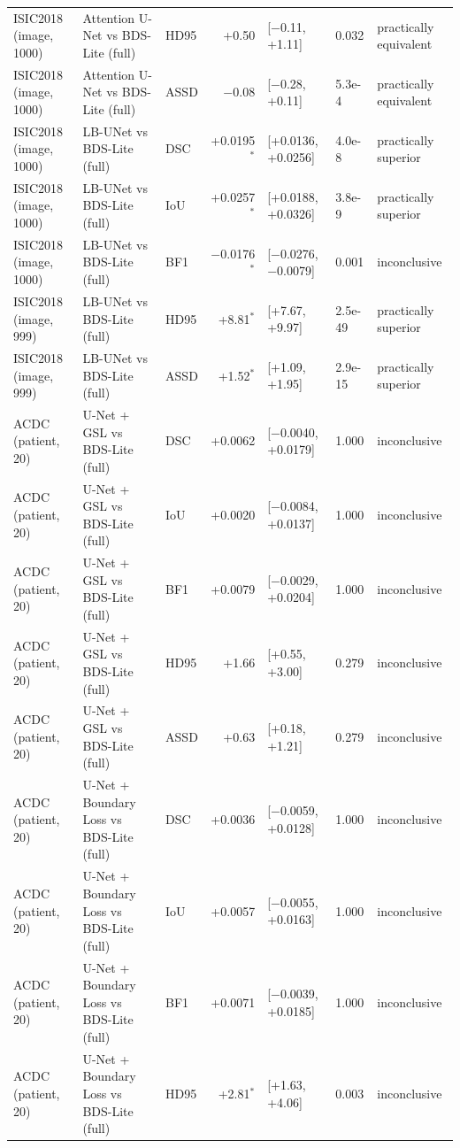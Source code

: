 \begin{tabular}{lllrlll}
ISIC2018 (image, 1000) & Attention U-Net vs BDS-Lite (full) & HD95 & +0.50 & [$-$0.11, +1.11] & 0.032 & practically equivalent \\
ISIC2018 (image, 1000) & Attention U-Net vs BDS-Lite (full) & ASSD & $-$0.08 & [$-$0.28, +0.11] & 5.3e-4 & practically equivalent \\
ISIC2018 (image, 1000) & LB-UNet vs BDS-Lite (full) & DSC & +0.0195$^{*}$ & [+0.0136, +0.0256] & 4.0e-8 & practically superior \\
ISIC2018 (image, 1000) & LB-UNet vs BDS-Lite (full) & IoU & +0.0257$^{*}$ & [+0.0188, +0.0326] & 3.8e-9 & practically superior \\
ISIC2018 (image, 1000) & LB-UNet vs BDS-Lite (full) & BF1 & $-$0.0176$^{*}$ & [$-$0.0276, $-$0.0079] & 0.001 & inconclusive \\
ISIC2018 (image, 999) & LB-UNet vs BDS-Lite (full) & HD95 & +8.81$^{*}$ & [+7.67, +9.97] & 2.5e-49 & practically superior \\
ISIC2018 (image, 999) & LB-UNet vs BDS-Lite (full) & ASSD & +1.52$^{*}$ & [+1.09, +1.95] & 2.9e-15 & practically superior \\
\midrule
ACDC (patient, 20) & U-Net + GSL vs BDS-Lite (full) & DSC & +0.0062 & [$-$0.0040, +0.0179] & 1.000 & inconclusive \\
ACDC (patient, 20) & U-Net + GSL vs BDS-Lite (full) & IoU & +0.0020 & [$-$0.0084, +0.0137] & 1.000 & inconclusive \\
ACDC (patient, 20) & U-Net + GSL vs BDS-Lite (full) & BF1 & +0.0079 & [$-$0.0029, +0.0204] & 1.000 & inconclusive \\
ACDC (patient, 20) & U-Net + GSL vs BDS-Lite (full) & HD95 & +1.66 & [+0.55, +3.00] & 0.279 & inconclusive \\
ACDC (patient, 20) & U-Net + GSL vs BDS-Lite (full) & ASSD & +0.63 & [+0.18, +1.21] & 0.279 & inconclusive \\
ACDC (patient, 20) & U-Net + Boundary Loss vs BDS-Lite (full) & DSC & +0.0036 & [$-$0.0059, +0.0128] & 1.000 & inconclusive \\
ACDC (patient, 20) & U-Net + Boundary Loss vs BDS-Lite (full) & IoU & +0.0057 & [$-$0.0055, +0.0163] & 1.000 & inconclusive \\
ACDC (patient, 20) & U-Net + Boundary Loss vs BDS-Lite (full) & BF1 & +0.0071 & [$-$0.0039, +0.0185] & 1.000 & inconclusive \\
ACDC (patient, 20) & U-Net + Boundary Loss vs BDS-Lite (full) & HD95 & +2.81$^{*}$ & [+1.63, +4.06] & 0.003 & inconclusive \\

\end{tabular}
